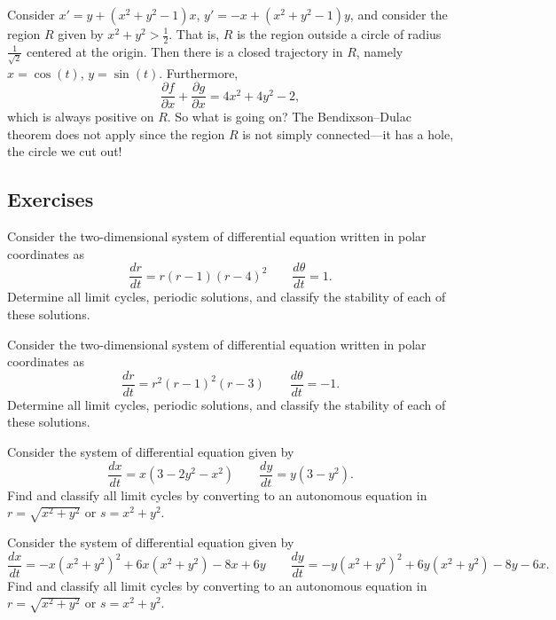 \begin{example}
Consider
$x' = y+(x^2+y^2-1)x$, 
$y' = -x +(x^2+y^2-1)y$, and consider the region $R$ given by $x^2+y^2 >
\frac{1}{2}$.  That is, $R$ is the region outside a circle of radius
$\frac{1}{\sqrt{2}}$ centered at the origin.  Then
there is a closed trajectory in $R$, namely $x=\cos(t)$, $y=\sin(t)$.
Furthermore,
\begin{equation*}
\frac{\partial f}{\partial x} + 
\frac{\partial g}{\partial x} = 4x^2+4y^2-2 ,
\end{equation*}
which is always positive on $R$.  So what is going on?  The Bendixson--Dulac theorem does not
apply since the region $R$ is not simply connected---it has a hole, the
circle we cut out!
\end{example}


\subsection{Exercises}

\begin{exercise}
Consider the two-dimensional system of differential equation written in polar coordinates as
\[ \frac{dr}{dt} = r(r-1)(r-4)^2 \qquad \frac{d\theta}{dt} = 1. \] Determine all limit cycles, periodic solutions, and classify the stability of each of these solutions. 
\end{exercise}

\begin{exercise}
Consider the two-dimensional system of differential equation written in polar coordinates as
\[ \frac{dr}{dt} = r^2(r-1)^2(r-3) \qquad \frac{d\theta}{dt} = -1. \] Determine all limit cycles, periodic solutions, and classify the stability of each of these solutions. 
\end{exercise}

\begin{exercise}\ansMark%
Consider the system of differential equation given by
\[ \frac{dx}{dt} = x(3- 2y^2 - x^2) \qquad \frac{dy}{dt} = y(3-y^2) .\]
Find and classify all limit cycles by converting to an autonomous equation in $r = \sqrt{x^2 + y^2}$ or $s = x^2 + y^2$. 
\end{exercise}

\begin{exercise}\ansMark%
Consider the system of differential equation given by
\[ \frac{dx}{dt} = -x(x^2 + y^2)^2 + 6x(x^2 + y^2) - 8x + 6y \qquad \frac{dy}{dt} = -y(x^2 + y^2)^2 + 6y(x^2 + y^2) - 8y - 6x .\]
Find and classify all limit cycles by converting to an autonomous equation in $r = \sqrt{x^2 + y^2}$ or $s = x^2 + y^2$. 
\end{exercise}

